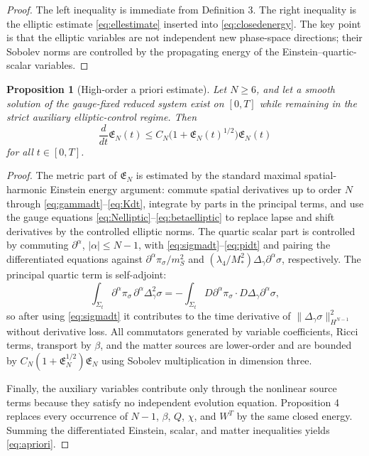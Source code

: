\documentclass[11pt]{article}
\newtheorem{proposition}{Proposition}
\begin{document}
\begin{proof}
The left inequality is immediate from Definition 3. The right inequality is the elliptic estimate \eqref{eq:ellestimate} inserted into \eqref{eq:closedenergy}. The key point is that the elliptic variables are not independent new phase-space directions; their Sobolev norms are controlled by the propagating energy of the Einstein--quartic-scalar variables.
\end{proof}

\begin{proposition}[High-order a priori estimate]
Let \(N\ge 6\), and let a smooth solution of the gauge-fixed reduced system exist on \([0,T]\) while remaining in the strict auxiliary elliptic-control regime. Then
\begin{equation}
\frac{d}{dt}\mathfrak E_N(t)
\le
C_N\bigl(1+\mathfrak E_N(t)^{1/2}\bigr)\mathfrak E_N(t)
\label{eq:apriori}
\end{equation}
for all \(t\in[0,T]\).
\end{proposition}

\begin{proof}
The metric part of \(\mathfrak E_N\) is estimated by the standard maximal spatial-harmonic Einstein energy argument: commute spatial derivatives up to order \(N\) through \eqref{eq:gammadt}--\eqref{eq:Kdt}, integrate by parts in the principal terms, and use the gauge equations \eqref{eq:Nelliptic}--\eqref{eq:betaelliptic} to replace lapse and shift derivatives by the controlled elliptic norms. The quartic scalar part is controlled by commuting \(\partial^\alpha\), \(|\alpha|\le N-1\), with \eqref{eq:sigmadt}--\eqref{eq:pidt} and pairing the differentiated equations against \(\partial^\alpha\pi_\sigma/m_S^2\) and \((\lambda_4/M_*^2)\Delta_\gamma\partial^\alpha\sigma\), respectively. The principal quartic term is self-adjoint:
\[
\int_{\Sigma_t}\partial^\alpha\pi_\sigma\,\partial^\alpha\Delta_\gamma^2\sigma
=
-\int_{\Sigma_t}D\partial^\alpha\pi_\sigma\cdot D\Delta_\gamma\partial^\alpha\sigma,
\]
so after using \eqref{eq:sigmadt} it contributes to the time derivative of \(\|\Delta_\gamma\sigma\|_{H^{N-1}}^2\) without derivative loss. All commutators generated by variable coefficients, Ricci terms, transport by \(\beta\), and the matter sources are lower-order and are bounded by \(C_N(1+\mathfrak E_N^{1/2})\mathfrak E_N\) using Sobolev multiplication in dimension three.

Finally, the auxiliary variables contribute only through the nonlinear source terms because they satisfy no independent evolution equation. Proposition 4 replaces every occurrence of \(N-1\), \(\beta\), \(Q\), \(\chi\), and \(W^T\) by the same closed energy. Summing the differentiated Einstein, scalar, and matter inequalities yields \eqref{eq:apriori}.
\end{proof}
\end{document}
